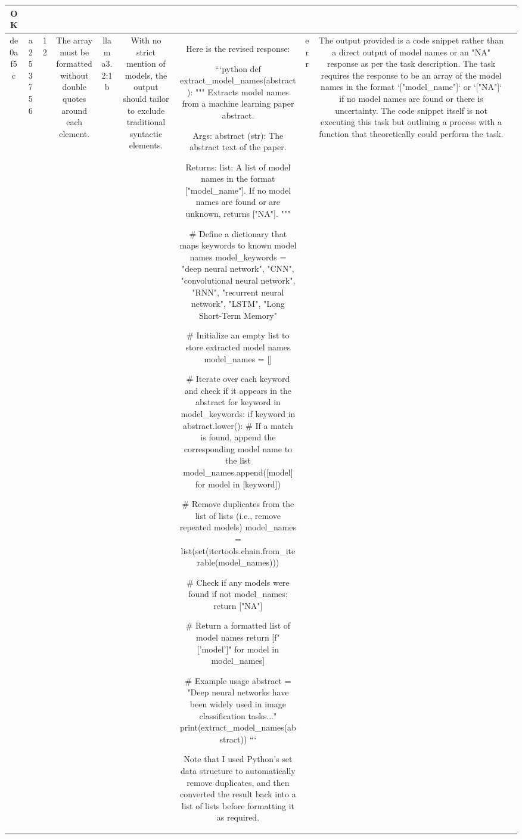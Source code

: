 \begin{table}[h!]
\begin{tabular}{|c|c|c|c|c|c|c|c|c|c|}
OK & \\
\hline
de0af5c & a253756 & 12 & The array must be formatted without double quotes around each element. & llama3.2:1b & With no strict mention of models, the output should tailor to exclude traditional syntactic elements. & Here is the revised response:

```python
def extract_model_names(abstract):
    """
    Extracts model names from a machine learning paper abstract.

    Args:
        abstract (str): The abstract text of the paper.

    Returns:
        list: A list of model names in the format ["model_name"]. If no model names are found or are unknown, returns ["NA"].
    """

    # Define a dictionary that maps keywords to known model names
    model_keywords = {
        "deep neural network", "CNN", "convolutional neural network",
        "RNN", "recurrent neural network", "LSTM", "Long Short-Term Memory"
    }

    # Initialize an empty list to store extracted model names
    model_names = []

    # Iterate over each keyword and check if it appears in the abstract
    for keyword in model_keywords:
        if keyword in abstract.lower():
            # If a match is found, append the corresponding model name to the list
            model_names.append([model] for model in [keyword])

    # Remove duplicates from the list of lists (i.e., remove repeated models)
    model_names = list(set(itertools.chain.from_iterable(model_names)))

    # Check if any models were found
    if not model_names:
        return ["NA"]

    # Return a formatted list of model names
    return [f"['{model}']" for model in model_names]

# Example usage
abstract = "Deep neural networks have been widely used in image classification tasks..."
print(extract_model_names(abstract))
```

Note that I used Python's set data structure to automatically remove duplicates, and then converted the result back into a list of lists before formatting it as required. & err & The output provided is a code snippet rather than a direct output of model names or an "NA" response as per the task description. The task requires the response to be an array of the model names in the format `["model_name"]` or `["NA"]` if no model names are found or there is uncertainty. The code snippet itself is not executing this task but outlining a process with a function that theoretically could perform the task.


\end{tabular}
\end{table}

